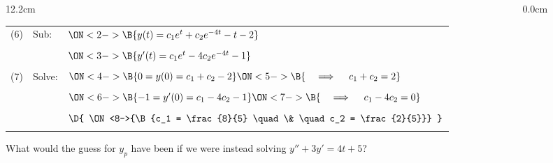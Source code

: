 \begin{frame}
\begin{columns}\begin{column}{12.2cm}
\scriptsize

\vspace{0.1cm}

{\setlength{\extrarowheight}{-0.1cm}
\begin{tabular}{p{0.07cm}p{0.9cm}p{10.6cm}}
	(6) & Sub: & $
	\ON<2->{\B{y(t) = c_1e^t + c_2e^{-4t} - t - 2}}$ \\
	&&\\
	&& $
	\ON<3->{\B{y'(t) = c_1e^t - 4c_2e^{-4t} - 1}}$ \\
	&&\\
	(7) & Solve: & $
	\ON<4->{\B{0 = y(0) = c_1 + c_2 - 2}} 
	\ON<5->{\B{\quad \implies \quad c_1 + c_2 = 2}} $ \\
	&&\\
	&& $
	\ON<6->{\B{-1 = y'(0) = c_1 - 4c_2 - 1}} 
	\ON<7->{\B{\quad \implies \quad c_1 - 4c_2 = 0}} $ \\
	&&\\
	&& $\D{
	\ON<8->{\B{c_1 = \frac{8}{5} \quad \& \quad c_2 = \frac{2}{5}}} }$ \\
	&&\\
\end{tabular}}


\vspace{0.5cm}

What would the guess for $y_p$ have been if we were instead solving $y''+3y'=4t+5$?

\vspace{0.2cm}

\begin{center}
\end{center}

\vspace{5.8cm}

\end{column}\begin{column}{0.0cm}\end{column}\end{columns}
\end{frame}

